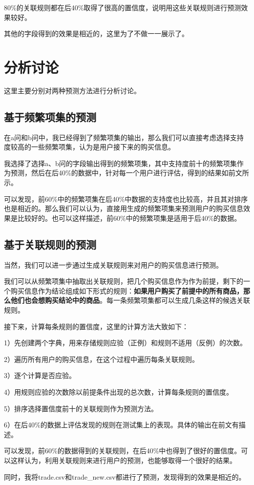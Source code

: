 \documentclass{article}
\begin{document}
\begin{CJK}{UTF8}{gbsn}
80\%的关联规则都在后40\%取得了很高的置信度，说明用这些关联规则进行预测效果较好。

其他的字段得到的效果是相近的，这里为了不做一一展示了。

\section{分析讨论}
这里主要分别对两种预测方法进行分析讨论。

\subsection{基于频繁项集的预测}
在a问和b问中，我已经得到了频繁项集的输出，那么我们可以直接考虑选择支持度较高的一些频繁项集，认为是用户接下来的购买信息。

我选择了选择a、b问的字段输出得到的频繁项集，其中支持度前十的频繁项集作为预测，然后在后40\%的数据中，针对每一个用户进行评估，得到的结果如前文所示。

可以发现，前60\%中的频繁项集在后40\%中数据的支持度也比较高，并且其对排序也是相近的。那么我们可以认为，直接用生成的频繁项集来预测用户的购买信息效果是比较好的。也可以这样描述，前60\%中的频繁项集是适用于后40\%的数据。


\subsection{基于关联规则的预测}
当然，我们可以进一步通过生成关联规则来对用户的购买信息进行预测。

我们可以从频繁项集中抽取出关联规则，把几个购买信息作为作为前提，剩下的一个购买信息作为结论组成如下形式的规则：\textbf{如果用户购买了前提中的所有商品，那么他们也会想购买结论中的商品}。每一条频繁项集都可以生成几条这样的候选关联规则。

接下来，计算每条规则的置信度，这里的计算方法大致如下：

1）先创建两个字典，用来存储规则应验（正例）和规则不适用（反例）的次数。

2）遍历所有用户的购买信息，在这个过程中遍历每条关联规则。

3）逐个计算是否应验。

4）用规则应验的次数除以前提条件出现的总次数，计算每条规则的置信度。

5）排序选择置信度前十的关联规则作为预测方法。

6）在后40\%的数据上评估发现的规则在测试集上的表现。具体的输出在前文有描述。

可以发现，前60\%的数据得到的关联规则，在后40\%中也得到了很好的置信度。可以这样认为，利用关联规则来进行用户的预测，也能够取得一个很好的结果。


同时，我将trade.csv和trade\_new.csv都进行了预测，发现得到的效果是相近的。

\end{CJK}
\end{document}

